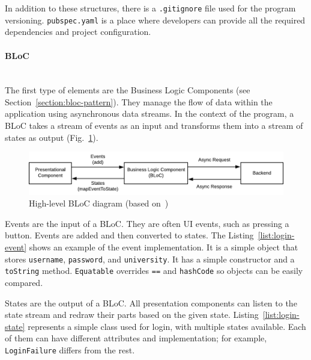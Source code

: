 In addition to these structures, there is a \texttt{.gitignore} file used for the program versioning. \texttt{pubspec.yaml} is a place where developers can provide all the required dependencies and project configuration.


\paragraph{\large{BLoC}}\mbox{}\\[2pt]
The first type of elements are the Business Logic Components (see Section~\ref{section:bloc-pattern}). They manage the flow of data within the application using asynchronous data streams. In the context of the program, a BLoC takes a stream of events as an input and transforms them into a stream of states as output (Fig.~\ref{fig:bloc-diagram}).

\begin{figure}[htb]
    \centering
    \includegraphics[]{fig04/bloc_diagram-01.pdf}
    \caption{High-level BLoC diagram (based on~\cite{bloc-diagram})}
    \label{fig:bloc-diagram}
\end{figure}

Events are the input of a BLoC. They are often UI events, such as pressing a button. Events are added and then converted to states. The Listing~\ref{list:login-event} shows an example of the event implementation. It is a simple object that stores \texttt{username}, \texttt{password}, and \texttt{university}. It has a simple constructor and a \texttt{toString} method. \texttt{Equatable} overrides \texttt{==} and \texttt{hashCode} so objects can be easily compared.



States are the output of a BLoC. All presentation components can listen to the state stream and redraw their parts based on the given state. Listing~\ref{list:login-state} represents a simple class used for login, with multiple states available. Each of them can have different attributes and implementation; for example, \texttt{LoginFailure} differs from the rest.

